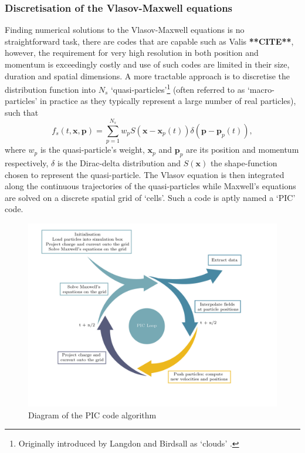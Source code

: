 \subsubsection{Discretisation of the Vlasov-Maxwell equations}
Finding numerical solutions to the Vlasov-Maxwell equations is no straightforward task, there are codes that are capable such as Valis \textbf{**CITE**}, however, the requirement for very high resolution in both position and momentum is exceedingly costly and use of such codes are limited in their size, duration and spatial dimensions. A more tractable approach is to discretise the distribution function into $N_s$ `quasi-particles'\footnote{Originally introduced by Langdon and Birdsall as `clouds' \cite{langdonTheoryPlasmaSimulation1970}.}  (often referred to as `macro-particles' in practice as they typically represent a large number of real particles), such that
\begin{equation}
	f_s(t,\mathbf{x},\mathbf{p}) = \sum^{N_s}_{p=1} w_p S(\mathbf{x}-\mathbf{x}_p(t))\delta (\mathbf{p}-\mathbf{p}_p(t)),
\end{equation}
where $w_p$ is the quasi-particle's weight, $\mathbf{x}_p$ and $\mathbf{p}_p$ are its position and momentum respectively, $\delta$ is the Dirac-delta distribution and $S(\mathbf{x})$ the shape-function chosen to represent the quasi-particle. The Vlasov equation is then integrated along the continuous trajectories of the quasi-particles while Maxwell's equations are solved on a discrete spatial grid of `cells'. Such a code is aptly named a `\ac{PIC}' code.

\begin{figure}
	\centering
	\includegraphics[width=\linewidth]{figures/intro/intro_PIC_cycle-01}
	\caption[Diagram of the PIC code algorithm]{Diagram of the PIC code algorithm}
	\label{fig:intropiccycle-01}
\end{figure}


